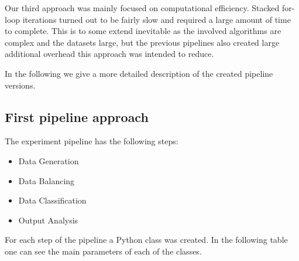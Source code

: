 Our third approach was mainly focused on computational efficiency. 
Stacked for-loop iterations turned out to be fairly slow and required a large amount of time to complete.
This is to some extend inevitable as the involved algorithms are complex and the datasets large, 
but the previous pipelines also created large additional overhead this approach was intended to reduce.

In the following we give a more detailed description of the created pipeline versions.

\subsection{First pipeline approach}


The experiment pipeline has the following steps:

\begin{itemize}
\item
  Data Generation
\item
  Data Balancing
\item
  Data Classification
\item
  Output Analysis
\end{itemize}

For each step of the pipeline a Python class was created. In the
following table one can see the main parameters of each of the classes.

